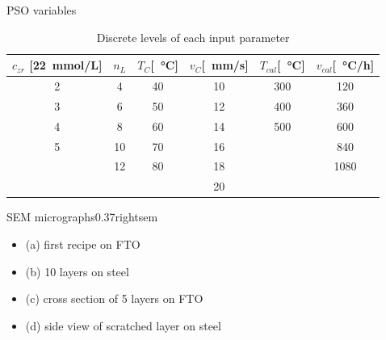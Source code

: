 \documentclass[hyperref={pdfpagelabels=false}, aspectratio=43, t]{beamer}  %
\begin{document}
\begin{frame}{PSO variables}
\begin{table}[htb]
	\centering
	\begin{tabular}{cc cc cc}
		\hline\hline
		$c_{zr}$ [\SI{22}{\milli\mol/\liter}]	&$n_L$	&$T_{C}$[\SI{}{\degreeCelsius}]	&$v_{C}$[\SI{}{\milli\meter/\second}]	&$T_{cal}$[\SI{}{\degreeCelsius}]	&$v_{cal}$[\SI{}{\degreeCelsius/\hour}]	\\
		\hline
		2				&4		&40					&10				&300				&120	\\
		3				&6		&50					&12				&400				&360	\\
		4				&8		&60					&14				&500				&600	\\
		5				&10		&70					&16				&					&840	\\
						&12		&80					&18				&					&1080	\\
						&		&					&20				&					&		\\
		\hline\hline
	\end{tabular}
	\caption{Discrete levels of each input parameter }
	\label{tab:input}
\end{table}
\end{frame}

\begin{graphicsFrame}{SEM micrographs}{}{0.37}{right}{sem}{}
		\begin{itemize}
			\item (a) first recipe on FTO
			\item (b) 10 layers on steel
			\item (c) cross section of 5 layers on FTO
			\item (d) side view of scratched layer on steel
		\end{itemize}
\end{graphicsFrame}
\end{document}
